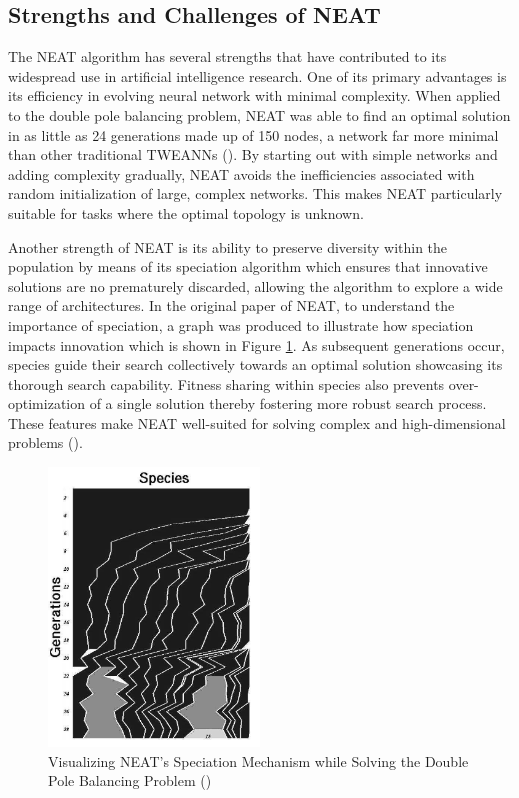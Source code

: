 \subsection{Strengths and Challenges of NEAT}
The NEAT algorithm has several strengths that have contributed to its widespread use in artificial intelligence research. One of its primary advantages is its efficiency in evolving neural network with minimal complexity. When applied to the double pole balancing problem, NEAT was able to find an optimal solution in as little as 24 generations made up of 150 nodes, a network far more minimal than other traditional TWEANNs (\cite{stanley2002evolving}). By starting out with simple networks and adding complexity gradually, NEAT avoids the inefficiencies associated with random initialization of large, complex networks. This makes NEAT particularly suitable for tasks where the optimal topology is unknown. \bigskip

\noindent Another strength of NEAT is its ability to preserve diversity within the population by means of its speciation algorithm which ensures that innovative solutions are no prematurely discarded, allowing the algorithm to explore a wide range of architectures. In the original paper of NEAT, to understand the importance of speciation, a graph was produced to illustrate how speciation impacts innovation which is shown in Figure \ref{fig:neat_speciate_vis}. As subsequent generations occur, species guide their search collectively towards an optimal solution showcasing its thorough search capability. Fitness sharing within species also prevents over-optimization of a single solution thereby fostering more robust search process. These features make NEAT well-suited for solving complex and high-dimensional problems (\cite{stanley2002evolving}).

\begin{figure}[H] %
	\centering %
	\includegraphics[width=0.50\textwidth]{Figures/chapter_ne/ne_neat_speciate_vis.png} %
	\caption{Visualizing NEAT's Speciation Mechanism while Solving the Double Pole Balancing Problem (\cite{stanley2002evolving})}
	\label{fig:neat_speciate_vis} %
\end{figure}

